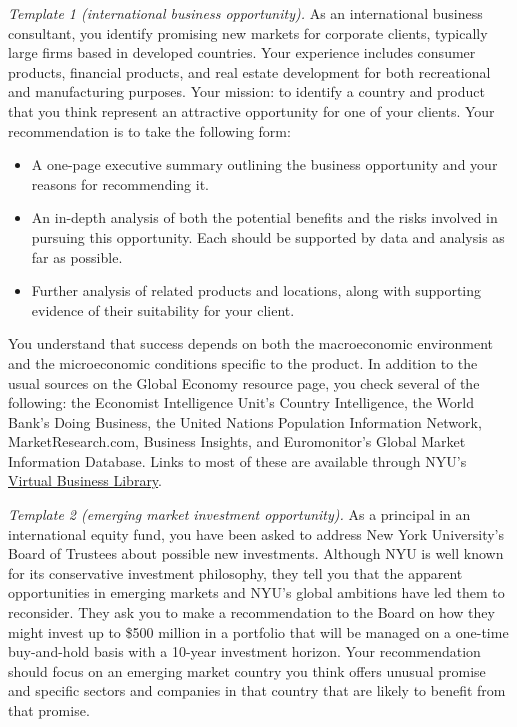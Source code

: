 \documentclass[letterpaper,12pt]{article}
\begin{document}
{\it Template 1 (international business opportunity).\/} 
As an international business consultant, 
you identify promising new markets for corporate clients, 
typically large firms based in  developed countries.
Your experience includes consumer products, 
financial products, 
and real estate development for both recreational 
and manufacturing purposes.  
Your mission:  to identify a country and product that you think 
represent an attractive opportunity for one of your clients.  
Your recommendation is to take the following form:   
%
\begin{itemize}%

\item A one-page executive summary outlining the business opportunity 
and your reasons for recommending it.   

\item An in-depth analysis of 
both the potential benefits and the risks involved 
in pursuing this opportunity.    
Each should be supported by 
data and analysis as far as possible.  

\item Further analysis of related products and locations, 
along with supporting evidence of their suitability for your client.  

\end{itemize}
%
You understand that success depends on both the macroeconomic 
environment and the microeconomic conditions specific to 
the product.      
In addition to the usual sources on the Global Economy 
{resource page},
you check several of the following:  
the Economist Intelligence Unit's 
{Country Intelligence},
the World Bank's 
{Doing Business},
the United Nations Population Information Network, 
MarketResearch.com, 
Business Insights,   
and Euromonitor's Global Market Information Database.  
Links to most of these are available through NYU's 
\href{http://library.nyu.edu/vbl/}
{Virtual Business Library}.  



{\it Template 2 (emerging market investment opportunity).\/} 
As a principal in an international equity fund, 
you have been asked to address New York University's Board of Trustees 
about possible new investments.
Although NYU is well known for its conservative investment philosophy, 
they tell you that the apparent opportunities in emerging markets 
and NYU's global ambitions have led them to reconsider.
They ask you to make a recommendation to the Board 
on how they might invest up to \$500 million in a portfolio 
that will be managed on a one-time buy-and-hold basis with a 10-year
investment horizon.  
Your recommendation should focus on 
an emerging market country you think offers unusual promise 
and specific sectors and companies in that country 
that are likely to benefit from that promise.  
\end{document}
